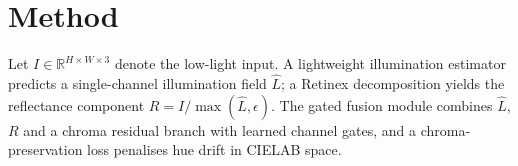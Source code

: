 \section{Method}
Let $I\in\mathbb{R}^{H\times W\times 3}$ denote the low-light input. A lightweight
illumination estimator predicts a single-channel illumination field
$\hat{L}$; a Retinex decomposition yields the reflectance component
$R = I / \max(\hat{L}, \epsilon)$. The gated fusion module combines $\hat{L}$,
$R$ and a chroma residual branch with learned channel gates, and a
chroma-preservation loss penalises hue drift in CIELAB space.
